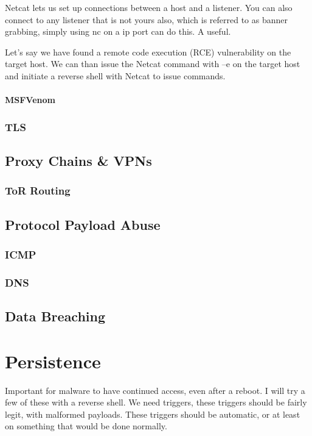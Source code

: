Netcat lets us set up connections between a host and a listener. You can also connect to any listener that is not yours also, which is referred to as banner grabbing, simply using nc on a ip port can do this. 
A useful. 

Let’s say we have found a remote code execution (RCE) vulnerability on the target host. We can than issue the Netcat command with –e on the target host and initiate a reverse shell with Netcat to issue commands.

\subsubsection{MSFVenom}
\subsection{TLS}
\section{Proxy Chains \& VPNs}
\subsection{ToR Routing}
\section{Protocol Payload Abuse}
\subsection{ICMP}
\subsection{DNS}
\section{Data Breaching}





\chapter{Persistence}
Important for malware to have continued access, even after a reboot. I will try a few of these with a reverse shell. 
We need triggers, these triggers should be fairly legit, with malformed payloads. These triggers should be automatic, or at least on something that would be done normally.

